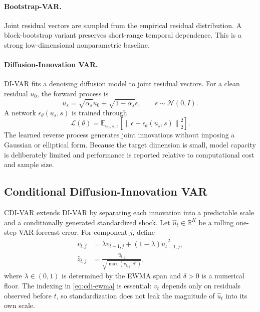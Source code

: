 \documentclass[11pt]{article}
\newcommand{\R}{\mathbb{R}}
\begin{document}
\paragraph{Bootstrap-VAR.}
Joint residual vectors are sampled from the empirical residual distribution. A block-bootstrap variant preserves short-range temporal dependence. This is a strong low-dimensional nonparametric baseline.

\paragraph{Diffusion-Innovation VAR.}
DI-VAR fits a denoising diffusion model to joint residual vectors. For a clean residual $u_0$, the forward process is
\begin{equation}
    u_s=\sqrt{\bar\alpha_s}u_0+
    \sqrt{1-\bar\alpha_s}\epsilon,
    \qquad \epsilon\sim\mathcal{N}(0,I).
\end{equation}
A network $\epsilon_{\theta}(u_s,s)$ is trained through
\begin{equation}
    \mathcal{L}(\theta)=
    \mathbb{E}_{u_0,s,\epsilon}
    \left[
        \left\|\epsilon-\epsilon_{\theta}(u_s,s)\right\|_2^2
    \right].
\end{equation}
The learned reverse process generates joint innovations without imposing a Gaussian or elliptical form. Because the target dimension is small, model capacity is deliberately limited and performance is reported relative to computational cost and sample size.

\subsection{Conditional Diffusion-Innovation VAR}

CDI-VAR extends DI-VAR by separating each innovation into a predictable scale and a conditionally generated standardized shock. Let $\widehat u_t\in\R^K$ be a rolling one-step VAR forecast error. For component $j$, define
\begin{align}
    v_{t,j} &= \lambda v_{t-1,j}+(1-\lambda)\widehat u_{t-1,j}^{,2},
    \label{eq:cdi-ewma}\\
    \widehat z_{t,j} &= \frac{\widehat u_{t,j}}
    {\sqrt{\max(v_{t,j},\delta^2)}},
    \label{eq:cdi-standardize}
\end{align}
where $\lambda\in(0,1)$ is determined by the EWMA span and $\delta>0$ is a numerical floor. The indexing in \eqref{eq:cdi-ewma} is essential: $v_t$ depends only on residuals observed before $t$, so standardization does not leak the magnitude of $\widehat u_t$ into its own scale.
\end{document}
